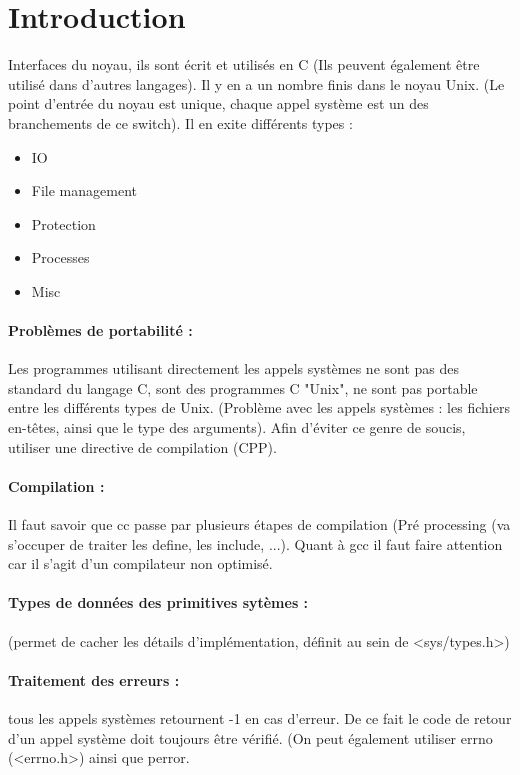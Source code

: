\documentclass{article}[12pt]
\begin{document}


\tableofcontents%
\newpage
\section{Introduction}
Interfaces du noyau, ils sont écrit et utilisés en C (Ils peuvent également être utilisé dans d'autres langages). Il y en a un nombre finis dans le noyau Unix. (Le point d'entrée du noyau est unique, chaque appel système est un des branchements de ce switch). Il en exite différents types :
\begin{itemize}
	\item IO
    \item File management
    \item Protection
    \item Processes
    \item Misc
\end{itemize}
\paragraph{Problèmes de portabilité : } Les programmes utilisant directement les appels systèmes ne sont pas des standard du langage C, sont des programmes C "Unix", ne sont pas portable entre les différents types de Unix. (Problème avec les appels systèmes : les fichiers en-têtes, ainsi que le type des arguments). Afin d'éviter ce genre de soucis, utiliser une directive de compilation (CPP).
\paragraph{Compilation : } Il faut savoir que cc passe par plusieurs étapes de compilation (Pré processing (va s'occuper de traiter les define, les include, ...). Quant à gcc il faut faire attention car il s'agit d'un compilateur non optimisé.
\paragraph{Types de données des primitives sytèmes : } (permet de cacher les détails d'implémentation, définit au sein de <sys/types.h>)
\paragraph{Traitement des erreurs :} tous les appels systèmes retournent -1 en cas d'erreur. De ce fait le code de retour d'un appel système doit toujours être vérifié. (On peut également utiliser errno (<errno.h>) ainsi que perror.
\end{document}
